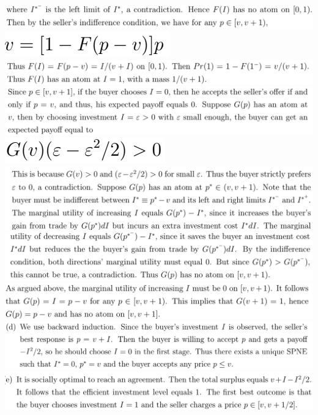 \documentclass[8pt,landscape]{extarticle}
\begin{document}
\begin{multicols*}{3}
    \includegraphics[width=0.77\linewidth,keepaspectratio]{Screenshots/Screenshot 2024-03-11 195857.png}
    \includegraphics[width=0.18\linewidth,keepaspectratio]{Screenshots/Screenshot 2024-03-11 195901.png}
    \includegraphics[width=0.78\linewidth,keepaspectratio]{Screenshots/Screenshot 2024-03-11 195906.png}
    \includegraphics[width=0.79\linewidth,keepaspectratio]{Screenshots/Screenshot 2024-03-11 195910.png}
    \includegraphics[width=0.17\linewidth,keepaspectratio]{Screenshots/Screenshot 2024-03-11 195914.png}
    \includegraphics[width=0.79\linewidth,keepaspectratio]{Screenshots/Screenshot 2024-03-11 195923.png}
    \includegraphics[width=0.79\linewidth,keepaspectratio]{Screenshots/Screenshot 2024-03-11 195926.png}
    \includegraphics[width=0.78\linewidth,keepaspectratio]{Screenshots/Screenshot 2024-03-11 195931.png}
    \includegraphics[width=0.82\linewidth,keepaspectratio]{Screenshots/Screenshot 2024-03-11 195936.png}
    \includegraphics[width=0.8\linewidth,keepaspectratio]{Screenshots/Screenshot 2024-03-11 195940.png}

\end{multicols*}
\end{document}
